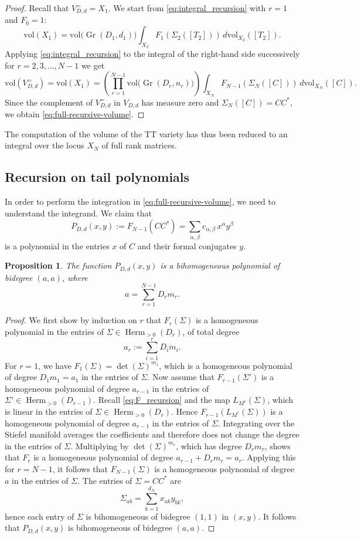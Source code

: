 \documentclass{article}
\newtheorem{proposition}[theorem]{Proposition}
\theoremstyle{definition}
\DeclareMathOperator{\Gr}{Gr}
\DeclareMathOperator{\Herm}{Herm}
\newcommand{\vol}{\mathrm{vol}}
\begin{document}
\begin{proof}
Recall that $V_{D,d}^= = X_1$. We start from \eqref{eq:integral_recursion} with $r=1$ and $F_0 = 1$:
\[
\vol(X_1)
=
\vol\bigl(\Gr(D_1,d_1)\bigr)
\int_{X_2}F_1(\Sigma_2([T_2]))\,d\vol_{X_2}([T_2]).
\]
Applying \eqref{eq:integral_recursion} to the integral of the right-hand side successively for \(r=2,3,\dots,N-1\)
we get
\[
\vol(V^{=}_{D,d}) =\vol(X_1)
=
\left(\prod_{r=1}^{N-1}\vol\bigl(\Gr(D_r,n_r)\bigr)\right)
\int_{X_N}F_{N-1}(\Sigma_N([C]))\,d\vol_{X_N}([C]).
\]
Since the complement of $V_{D,d}^{=}$ in $V_{D,d}$ has measure zero and \(\Sigma_N([C])=CC^*\), we obtain \eqref{eq:full-recursive-volume}.
\end{proof}
\noindent
The computation of the volume of the TT variety has thus been reduced to an integral over the locus \(X_N\) of full rank matrices. 


\subsection{Recursion on tail polynomials}\label{sec:integration}
In order to perform the integration in \eqref{eq:full-recursive-volume}, we need to understand the integrand. We claim that
\[
P_{D,d}(x,y):=F_{N-1}(CC^*)
=
\sum_{\alpha,\beta} c_{\alpha,\beta}\,x^\alpha y^\beta
\]
is a polynomial in the entries $x$ of \(C\) and their formal conjugates \(y\).

\begin{proposition}\label{prop:polynomial_C}
The function $P_{D,d}(x,y)$ is a bihomogeneous polynomial of bidegree \((a,a)\), where
\[
a=\sum_{r=1}^{N-1}D_rm_r.
\]
\end{proposition}

\begin{proof}
We first show by induction on \(r\) that \(F_r(\Sigma)\) is a homogeneous polynomial in the entries of
\(\Sigma\in \Herm_{>0}(D_r)\), of total degree
\begin{equation}\label{eq:a_r}
a_r:=\sum_{i=1}^r D_i m_i.
\end{equation}
For \(r=1\), we have $F_1(\Sigma)=\det(\Sigma)^{m_1}$,
which is a homogeneous polynomial of degree \(D_1m_1=a_1\) in the entries of \(\Sigma\).
Now assume that \(F_{r-1}(\Sigma')\) is a homogeneous polynomial of degree \(a_{r-1}\) in the entries of
\(\Sigma'\in \Herm_{>0}(D_{r-1})\). Recall \eqref{eq:F_recursion} and the map $L_{M^r}(\Sigma)$, which is linear in the entries of \(\Sigma\in \Herm_{>0}(D_r)\). Hence $F_{r-1}(
L_{M^r}(\Sigma))$
is a homogeneous polynomial of degree \(a_{r-1}\) in the entries of \(\Sigma\). Integrating over
the Stiefel manifold averages the coefficients and therefore does not change the degree in the entries of $\Sigma$. Multiplying by \(\det(\Sigma)^{m_r}\), which has degree \(D_rm_r\),
shows that \(F_r\) is a homogeneous polynomial of degree $a_{r-1}+D_rm_r=a_r$.
Applying this for \(r=N-1\), it follows that \(F_{N-1}(\Sigma)\) is a homogeneous polynomial of degree $a$ in the entries of \(\Sigma\). The entries of
\(\Sigma=CC^*\) are
\[
\Sigma_{ab}=\sum_{k=1}^{d_N}x_{ak}y_{bk},
\]
hence each entry of \(\Sigma\) is bihomogeneous of bidegree \((1,1)\) in \((x,y)\). It follows that $P_{D,d}(x,y)$ is bihomogeneous of bidegree \((a,a)\).
\end{proof}
\end{document}
